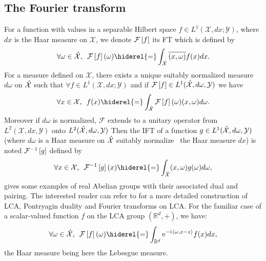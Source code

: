 \subsection{The Fourier transform}
For a function with values in a separable Hilbert space $f\in L^1(\mathcal{X},dx;\mathcal{Y})$, where $dx$ is the Haar measure on $\mathcal{X}$, we denote $\mathcal{F}\left[f\right]$ its \acf{FT} which is defined by
\begin{dmath*}
    \forall \omega \in \dual{\mathcal{X}},\enskip \FT{f}(\omega) \hiderel{=}\int_{\dual{\mathcal{X}}} \conj{\pairing{x,\omega}}f(x)dx.
\end{dmath*} 
For a measure defined on $\mathcal{X}$, there exists a unique suitably normalized measure $d\omega$ on $\hat{\mathcal{X}}$ such that $\forall f \in L^1(\mathcal{X}, dx;\mathcal{Y})$ and if $\mathcal{F}\left[f\right] \in L^1(\hat{\mathcal{X}}, d\omega, \mathcal{Y})$ we have
 \begin{dmath}\label{fourier-l1}
 \forall x \in \mathcal{X},\enskip f(x)\hiderel{=}\int_{\dual{\mathcal{X}}}\FT{f}(\omega)(x,\omega) d\omega.
\end{dmath}
Moreover if $d\omega$ is normalized, $\mathcal{F}$ extends to a unitary operator from $L^2(\mathcal{X}, dx, \mathcal{Y})$ onto $L^2(\hat{\mathcal{X}}, d\omega, \mathcal{Y})$ Then the \acf{IFT} of a function $g\in L^1(\hat{\mathcal{X}},d\omega,\mathcal{Y})$ (where $d\omega$ is a Haar measure on $\hat{\mathcal{X}}$ suitably normalize \wrt~the Haar measure $dx$) is noted $\mathcal{F}^{-1}\left[g\right]$ defined by
\begin{dmath*}
    \forall x \in \mathcal{X},\enskip \IFT{g}(x) \hiderel{=} \int_{\dual{\mathcal{X}}} \pairing{x,\omega}g(\omega) d\omega,
\end{dmath*}
 gives some examples of real Abelian groups with their associated dual and pairing. The interested reader can refer to \citet{folland1994course} for a more detailed construction of LCA, Pontryagin duality and Fourier transforms on LCA. For the familiar case of a scalar-valued function $f$ on the \acs{LCA} group $(\mathbb{R}^d, +)$, we have: 
 \begin{dmath}\label{fourier-R-plus}
 \forall \omega \in \dual{\mathcal{X}},\enskip \FT{f}(\omega)\hiderel{=}\int_{\mathbb{R}^d} \ec^{-\iu \inner{\omega,x - z}}f(x) dx,
\end{dmath}
the Haar measure being here the Lebesgue measure.

